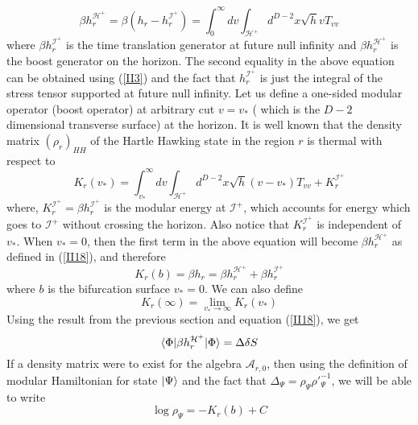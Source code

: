 \documentclass[12pt]{article}
\DeclarePairedDelimiter\bra{\langle}{\rvert}
\DeclarePairedDelimiter\ket{\lvert}{\rangle}
\begin{document}
\begin{equation}\label{II18}
\beta h_r^{\mathcal{H}^+}=\beta (h_r -h_r^{\mathcal{I^+}})= \int_{0}^{\infty} dv \int_{\mathcal{H}^{+}} d^{D-2}x \sqrt{h} v T_{vv}
\end{equation}
where $\beta h_r^{\mathcal{I^+}}$ is the time translation generator at future null infinity and $\beta h_r^{\mathcal{H}^+}$ is the boost generator on the horizon. The second equality in the above equation can be obtained using (\ref{II3})  and the fact that $h_r^{\mathcal{I^+}}$ is just the integral of the stress tensor supported at future null infinity. Let us define a one-sided modular operator (boost operator) at arbitrary cut $v=v_*$ ( which is the $D-2$ dimensional transverse surface) at the horizon. It is well known that the density matrix $(\rho_r)_{HH}$ of the Hartle Hawking state in the region $r$ is thermal with respect to \cite{JE,AW}
\begin{equation}\label{II18a}
K_r(v_*)=  \int_{v_*}^{\infty} dv \int_{\mathcal{H}^{+}} d^{D-2}x \sqrt{h} (v-v_*) T_{vv}+ K_r^{\mathcal{I^+}}
\end{equation}
where, $K_r^{\mathcal{I^+}}=\beta h_r^{\mathcal{I^+}}$ is the modular energy at $\mathcal{I^+}$, which accounts for energy which goes to $\mathcal{I^+}$ without crossing the horizon. Also notice that $K_r^{\mathcal{I^+}}$ is independent of $v_*$.  When $v_*=0$, then the first term in the above equation will become $\beta h_r^{\mathcal{H}^+}$ as defined in (\ref{II18}), and therefore
\begin{equation}\label{II18b}
K_r(b)=\beta h_r= \beta h_r^{\mathcal{H}^+} +\beta h_r^{\mathcal{I^+}}
\end{equation}
where $b$ is the bifurcation surface $v_*=0$. We can also define
\begin{equation}\label{II18c}
K_r(\infty)=\lim_{v_* \rightarrow \infty}K_r(v_*)
\end{equation}
Using the result from the previous section and equation (\ref{II18}), we get
\begin{equation}\label{II19}
\bra{\Phi }\beta h_r^{\mathcal{H^+}}\ket{\Phi}= \Delta \delta S
\end{equation}
If a density matrix were to exist for the algebra $\mathcal{A}_{r,0}$, then using the definition of modular Hamiltonian for state $\ket{\Psi}$ and the fact that $\Delta_{\Psi}= \rho_{\Psi}\rho'^{-1}_{\Psi} $, we will be able to write
\begin{equation}\label{II20}
\log{\rho_{\Psi}}=- K_{r}(b)+C
\end{equation}
\end{document}
